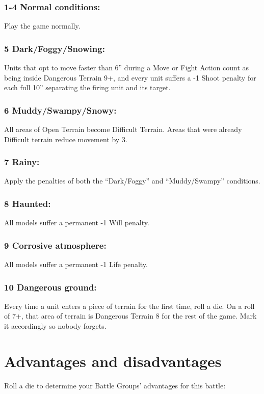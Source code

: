 \begin{multicols}{2}
\subsubsection*{1-4 Normal conditions:} Play the game normally.

\subsubsection*{5 Dark/Foggy/Snowing:} Units that opt to move faster than 6'' during a Move or Fight Action count as being inside Dangerous Terrain 9+, and every unit suffers a -1 Shoot penalty for each full 10'' separating the firing unit and its target.

\subsubsection*{6 Muddy/Swampy/Snowy:} All areas of Open Terrain become Difficult Terrain. Areas that were already Difficult terrain reduce movement by 3.

\subsubsection*{7 Rainy:} Apply the penalties of both the ``Dark/Foggy'' and ``Muddy/Swampy'' conditions.

\subsubsection*{8 Haunted:} All models suffer a permanent -1 Will penalty.

\subsubsection*{9 Corrosive atmosphere:} All models suffer a permanent -1 Life penalty.

\subsubsection*{10 Dangerous ground:} Every time a unit enters a piece of terrain for the first time, roll a die. On a roll of 7+, that area of terrain is Dangerous Terrain 8 for the rest of the game. Mark it accordingly so nobody forgets.




\section*{Advantages and disadvantages}
Roll a die to determine your Battle Groups' advantages for this battle:

\end{multicols}
